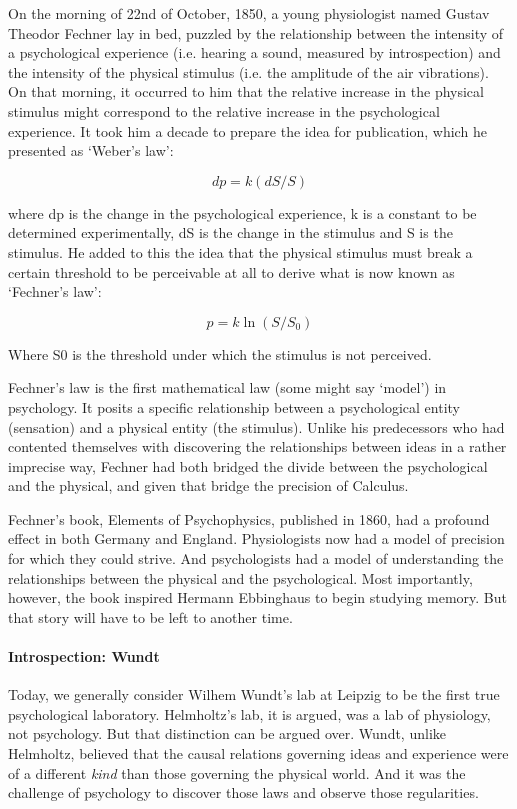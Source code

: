 On the morning of 22nd of October, 1850, a young physiologist named Gustav Theodor Fechner lay in bed, puzzled by the relationship between the intensity of a psychological experience (i.e. hearing a sound, measured by introspection) and the intensity of the physical stimulus (i.e. the amplitude of the air vibrations). On that morning, it occurred to him that the relative increase in the physical stimulus might correspond to the relative increase in the psychological experience. It took him a decade to prepare the idea for publication, which he presented as `Weber's law':

\[ dp = k(dS/S) \]

where dp is the change in the psychological experience, k is a constant to be determined experimentally, dS is the change in the stimulus and S is the stimulus. He added to this the idea that the physical stimulus must break a certain threshold to be perceivable at all to derive what is now known as `Fechner's law':

\[ p = k\ln(S/S_{0}) \] 

Where S0 is the threshold under which the stimulus is not perceived.

Fechner's law is the first mathematical law (some might say `model') in psychology. It posits a specific relationship between a psychological entity (sensation) and a physical entity (the stimulus). Unlike his predecessors who had contented themselves with discovering the relationships between ideas in a rather imprecise way, Fechner had both bridged the divide between the psychological and the physical, and given that bridge the precision of Calculus. 

Fechner's book, Elements of Psychophysics, published in 1860, had a profound effect in both Germany and England. Physiologists now had a model of precision for which they could strive. And psychologists had a model of understanding the relationships between the physical and the psychological. Most importantly, however, the book inspired Hermann Ebbinghaus to begin studying memory. But that story will have to be left to another time.

\paragraph{Introspection: Wundt}
\label{introspection:wundt}

Today, we generally consider Wilhem Wundt's lab at Leipzig to be the first true psychological laboratory. Helmholtz's lab, it is argued, was a lab of physiology, not psychology. But that distinction can be argued over. Wundt, unlike Helmholtz, believed that the causal relations governing ideas and experience were of a different \emph{kind} than those governing the physical world. And it was the challenge of psychology to discover those laws and observe those regularities.

